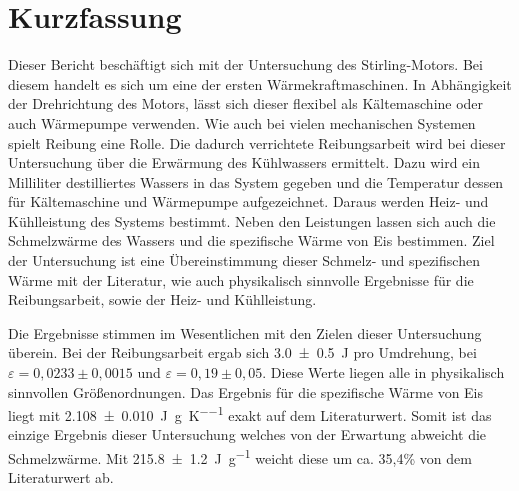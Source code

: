 \section{Kurzfassung}

Dieser Bericht beschäftigt sich mit der Untersuchung des Stirling-Motors.
Bei diesem handelt es sich um eine der ersten Wärmekraftmaschinen.
In Abhängigkeit der Drehrichtung des Motors, lässt sich dieser flexibel als Kältemaschine oder auch Wärmepumpe verwenden.
Wie auch bei vielen mechanischen Systemen spielt Reibung eine Rolle.
Die dadurch verrichtete Reibungsarbeit wird bei dieser Untersuchung über die Erwärmung des Kühlwassers ermittelt.
Dazu wird ein Milliliter destilliertes Wassers in das System gegeben und die Temperatur dessen für Kältemaschine und Wärmepumpe aufgezeichnet.
Daraus werden Heiz- und Kühlleistung des Systems bestimmt.
Neben den Leistungen lassen sich auch die Schmelzwärme des Wassers und die spezifische Wärme von Eis bestimmen.
Ziel der Untersuchung ist eine Übereinstimmung dieser Schmelz- und spezifischen Wärme mit der Literatur, wie auch physikalisch sinnvolle Ergebnisse für die Reibungsarbeit, sowie der Heiz- und Kühlleistung.

Die Ergebnisse stimmen im Wesentlichen mit den Zielen dieser Untersuchung überein.
Bei der Reibungsarbeit ergab sich \SI{3.0+-0.5}{\joule} pro Umdrehung, bei $\varepsilon = 0,0233\pm 0,0015$ und $\varepsilon = 0,19\pm 0,05$.
Diese Werte liegen alle in physikalisch sinnvollen Größenordnungen.
Das Ergebnis für die spezifische Wärme von Eis liegt mit \SI{2.108+-0.010}{\joule\per\gram\per\kelvin} exakt auf dem Literaturwert.
Somit ist das einzige Ergebnis dieser Untersuchung welches von der Erwartung abweicht die Schmelzwärme.
Mit \SI{215.8+-1.2}{\joule\per\gram} weicht diese um ca. 35,4\% von dem Literaturwert ab.
